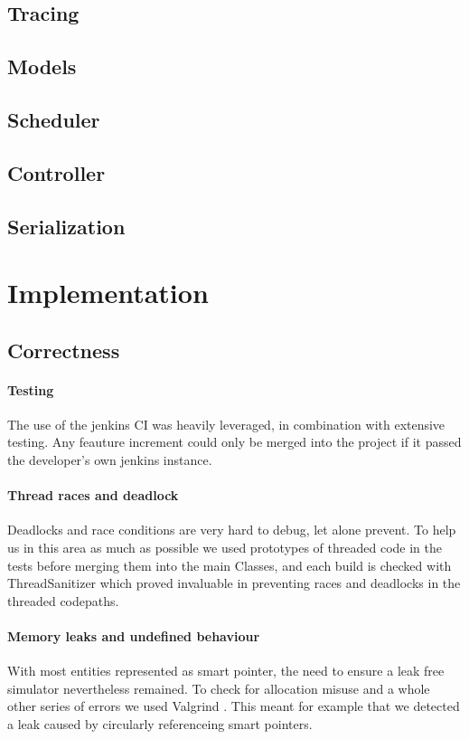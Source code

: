 \documentclass[8pt,a4paper]{report}
\begin{document}
\section{Tracing}

\section{Models}

\section{Scheduler}

\section{Controller}

\section{Serialization}

\chapter{Implementation}
\section{Correctness}
\subsubsection{Testing}
The use of the jenkins CI was heavily leveraged, in combination with extensive testing. Any feauture increment could only be merged into the project if it passed the developer's own jenkins instance.
\subsubsection{Thread races and deadlock}
Deadlocks and race conditions are very hard to debug, let alone prevent. To help us in this area as much as possible we used prototypes of threaded code in the tests before merging them into the main Classes, and each build is checked with ThreadSanitizer \cite{} which proved invaluable in preventing races and deadlocks in the threaded codepaths.
\subsubsection{Memory leaks and undefined behaviour}
With most entities represented as smart pointer, the need to ensure a leak free simulator nevertheless remained. To check for allocation misuse and a whole other series of errors we used Valgrind \cite{}. This meant for example that we detected a leak caused by circularly referenceing smart pointers.
\end{document}
